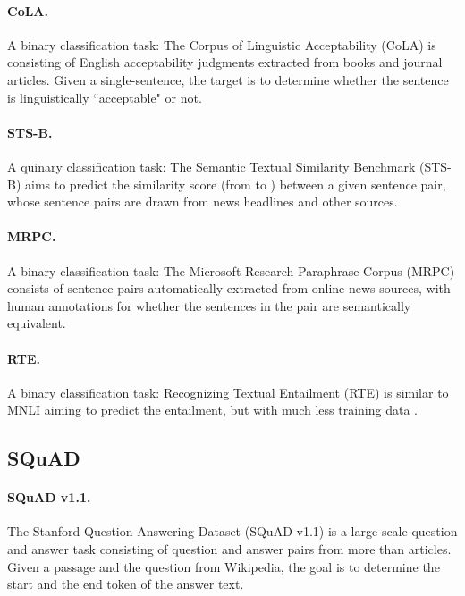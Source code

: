 \documentclass[letterpaper]{article} \usepackage{aaai22}  \usepackage{times}  \usepackage{helvet}  \usepackage{courier}  \usepackage[hyphens]{url}  \usepackage{graphicx} \urlstyle{rm} \def\UrlFont{\rm}  \usepackage{natbib}  \usepackage{caption} \DeclareCaptionStyle{ruled}{labelfont=normalfont,labelsep=colon,strut=off} \frenchspacing  \setlength{\pdfpagewidth}{8.5in}  \setlength{\pdfpageheight}{11in}  \usepackage{algorithm}
\begin{document}
\paragraph{CoLA.}
A binary classification task: The Corpus of Linguistic Acceptability (CoLA) \citep{warstadt2019neural} is consisting of English acceptability judgments extracted from books and journal articles. Given a single-sentence, the target is to determine whether the sentence is linguistically ``acceptable" or not.

\paragraph{STS-B.}
A quinary classification task: The Semantic Textual Similarity Benchmark (STS-B) \citep{cer2017semeval} aims to predict the similarity score (from  to ) between a given sentence pair, whose sentence pairs are drawn from news headlines and other sources.

\paragraph{MRPC.}
A binary classification task: The Microsoft Research Paraphrase Corpus (MRPC) \citep{dolan2005automatically} consists of  sentence pairs automatically extracted from online news sources, with human annotations for whether the sentences in the pair are semantically equivalent.

\paragraph{RTE.}
A binary classification task: Recognizing Textual Entailment (RTE) is similar to MNLI aiming to predict the entailment, but with much less training data \citep{dagan2005pascal}.

\subsection{SQuAD}
\paragraph{SQuAD v1.1.}
The Stanford Question Answering Dataset (SQuAD v1.1) \cite{rajpurkar2016squad} is a large-scale question and answer task consisting of  question and answer pairs from more than  articles. Given a passage and the question from Wikipedia, the goal is to determine the start and the end token of the answer text.
\end{document}

